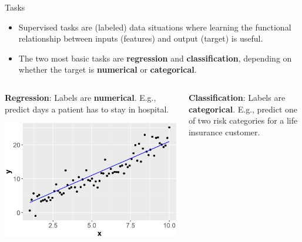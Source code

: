 \documentclass[11pt,compress,t,notes=noshow, xcolor=table]{beamer}
\begin{document}
\begin{vbframe}{Tasks}
\begin{itemize}
    \item Supervised tasks are (labeled) data situations where learning the functional
        relationship between inputs (features) and output (target) is
        useful.
    
    \item The two most basic tasks are 
        \textbf{regression} and \textbf{classification}, depending on whether the 
        target is \textbf{numerical} or \textbf{categorical}. 
\end{itemize}  

\lz

\begin{columns}    
\begin{column}{0.4\textwidth} 
\small \textbf{Regression}: Labels are \textbf{numerical}. E.g., predict days a patient has to stay in hospital.

  \begin{center}
    \includegraphics[width=\textwidth]{figure/ml-basics-supervised-regression-task.png} 
  \end{center}
\end{column}    

\begin{column}{0.4\textwidth} 
\small \textbf{Classification}: Labels are \textbf{categorical}. E.g., predict one of two risk categories for a life insurance customer. 
  

\end{column}
\end{columns}
\end{vbframe}
\end{document}
